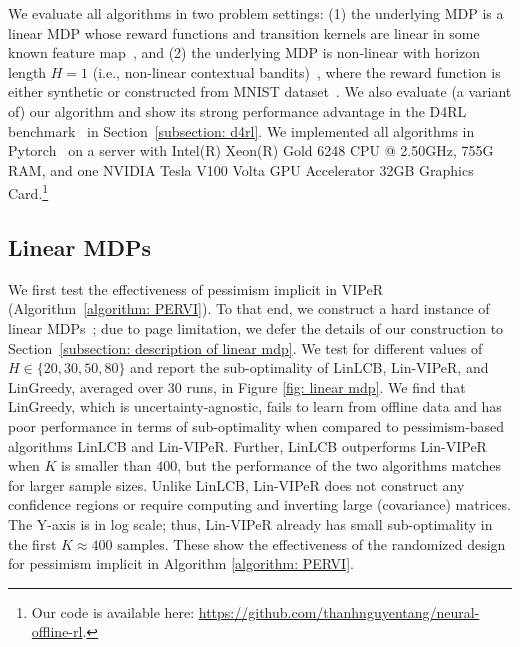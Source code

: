 \documentclass{article} \usepackage{iclr2023/iclr2023_conference,times}
\begin{document}
We evaluate all algorithms in two problem settings: (1) the underlying MDP is a linear MDP whose reward functions and transition kernels are linear in some known feature map~\citep{jin2020provably}, and (2) the underlying MDP is non-linear with horizon length $H = 1$ (i.e., non-linear contextual bandits)~\citep{zhou2020neural}, where the reward function is either synthetic or constructed from MNIST dataset~\citep{lecun1998gradient}. We also evaluate (a variant of) our algorithm and show its strong performance advantage in the D4RL benchmark~\citep{DBLP:journals/corr/abs-2004-07219} in Section~\ref{subsection: d4rl}. We implemented all algorithms in Pytorch~\citep{paszke2019pytorch} on a server with Intel(R) Xeon(R) Gold 6248 CPU @ 2.50GHz, 755G RAM, and one NVIDIA Tesla V100 Volta GPU Accelerator 32GB Graphics Card.\footnote{Our code is available here: \url{https://github.com/thanhnguyentang/neural-offline-rl}.}















\subsection{Linear MDPs}
\label{subsection: linear mdp}


We first test the effectiveness of pessimism implicit in VIPeR (Algorithm~\ref{algorithm: PERVI}). To that end, we construct a hard instance of linear MDPs~\citep{yinnear,min2021variance}; due to page limitation, we defer the details of our construction to Section~\ref{subsection: description of linear mdp}. We test for different values of $H \in \{20,30,50,80\}$ and report the sub-optimality of LinLCB, Lin-VIPeR, and LinGreedy, averaged over $30$ runs, in Figure \ref{fig: linear mdp}. 
We find that LinGreedy, which is uncertainty-agnostic, fails to learn from offline data and has poor performance in terms of sub-optimality when compared to pessimism-based algorithms LinLCB and Lin-VIPeR. Further, LinLCB outperforms Lin-VIPeR when $K$ is smaller than $400$, but the performance of the two algorithms matches for larger sample sizes. Unlike LinLCB, Lin-VIPeR does not construct any confidence regions or require computing and inverting large (covariance) matrices. The Y-axis is in log scale; thus, Lin-VIPeR already has small sub-optimality in the first $K \approx 400$ samples. These show the effectiveness of the randomized design for pessimism implicit in Algorithm \ref{algorithm: PERVI}. 
\end{document}
